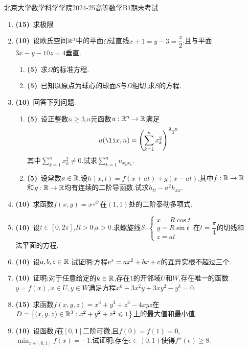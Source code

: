 \documentclass{ctexart}
\begin{document}
\pagestyle{empty}

\begin{center}\Large
    北京大学数学科学学院2024-25高等数学B1期末考试
\end{center}
\begin{enumerate}[leftmargin=*,label=\textbf{\arabic*.}]
    \item \textbf{(15)}\ 求极限
    \item \textbf{(10)}\ 设欧氏空间$\mathbb{R}^3$中的平面$\Omega$过直线$x+1=y-3=\dfrac{z}2$,且与平面$3x-y-10z=4$垂直.
        \begin{enumerate}[label=\tbf{(\arabic*)}]
            \item \textbf{(5)}\ 求$\Omega$的标准方程.
            \item \textbf{(5)}\ 已知以原点为球心的球面$S$与$\Omega$相切,求$S$的方程.
        \end{enumerate}
    \item \textbf{(10)}\ 回答下列问题.
        \begin{enumerate}[label=\tbf{(\arabic*)}]
            \item \textbf{(5)}\ 设正整数$n\geqslant3$,$n$元函数$u:\mathbb{R}^n\to\mathbb{R}$满足
                \[u(\li x,n)=\left(\sum_{k=1}^nx_k^2\right)^{\frac{2-n}{2}}\]
                其中$\displaystyle\sum_{k=1}^nx_k^2\neq0$.试求$\displaystyle\sum_{k=1}^{n}u_{x_kx_k}$.
            \item \textbf{(5)}\ 设常数$a\in\mathbb{R}$,设$h(x,t)=f(x+at)+g(x-at)$,其中$f:\mathbb{R}\to\mathbb{R}$和$g:\mathbb{R}\to\mathbb{R}$均有连续的二阶导函数.试求$h_{tt}-a^2h_{xx}$.
        \end{enumerate}
    \item \textbf{(10)}\ 求函数$f(x,y)=x^{\sqrt{y}}$在$(1,1)$处的二阶泰勒多项式.
    \item \textbf{(10)}\ 设$t\in[0,2\pi]$,$R>0$,$a>0$.求螺旋线$S:\left\{\begin{array}{l}
            x=R\cos t\\
            y=R\sin t\\
            z=at
        \end{array}\right.$在$t=\dfrac\pi4$的切线和法平面的方程.
    \item \textbf{(10)}\ 设$a,b,c\in\mathbb{R}$.试证明:方程$\mathrm{e}^x=ax^2+bx+c$的互异实根不超过三个.
    \item \textbf{(10)}\ 证明:对于任意给定的$k\in\mathbb{R}$,存在$1$的开邻域$U$和$W$,存在唯一的函数$y=f(x),x\in U,y\in W$满足方程$x^k-3x^2y+3xy^2-y^k=0$.
    \item \textbf{(15)}\ 求函数$f(x,y,z)=x^3+y^3+z^3-4xyz$在$D=\left\{(x,y,z)\in\mathbb{R}^3:x^2+y^2+z^2\leqslant1\right\}$上的最大值和最小值.
    \item \textbf{(10)}\ 设函数$f$在$[0,1]$二阶可微,且$f(0)=f(1)=0$,$\displaystyle\min_{x\in[0,1]}f(x)=-1$.试证明:存在$\epsilon\in(0,1)$使得$f''(\epsilon)\geqslant8$.
\end{enumerate}
\end{document}
